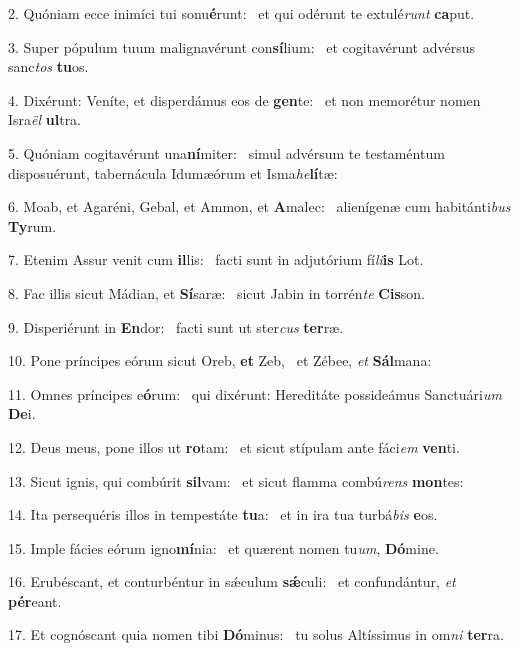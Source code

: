 2. Quóniam ecce inimíci tui sonu\textbf{é}runt: \ast\  et qui odérunt te extulé\textit{runt} \textbf{ca}put.\

3. Super pópulum tuum malignavérunt con\textbf{sí}lium: \ast\  et cogitavérunt advérsus sanc\textit{tos} \textbf{tu}os.\

4. Dixérunt: Veníte, et disperdámus eos de \textbf{gen}te: \ast\  et non memorétur nomen Isra\textit{ël} \textbf{ul}tra.\

5. Quóniam cogitavérunt una\textbf{ní}miter: \ast\  simul advérsum te testaméntum disposuérunt, tabernácula Idumæórum et Isma\textit{he}\textbf{lí}tæ:\

6. Moab, et Agaréni, Gebal, et Ammon, et \textbf{A}malec: \ast\  alienígenæ cum habitánti\textit{bus} \textbf{Ty}rum.\

7. Etenim Assur venit cum \textbf{il}lis: \ast\  facti sunt in adjutórium fí\textit{li}\textbf{is} Lot.\

8. Fac illis sicut Mádian, et \textbf{Sí}saræ: \ast\  sicut Jabin in torrén\textit{te} \textbf{Cis}son.\

9. Disperiérunt in \textbf{En}dor: \ast\  facti sunt ut ster\textit{cus} \textbf{ter}ræ.\

10. Pone príncipes eórum sicut Oreb, \textbf{et} Zeb, \ast\  et Zébee, \textit{et} \textbf{Sál}mana:\

11. Omnes príncipes e\textbf{ó}rum: \ast\  qui dixérunt: Hereditáte possideámus Sanctuári\textit{um} \textbf{De}i.\

12. Deus meus, pone illos ut \textbf{ro}tam: \ast\  et sicut stípulam ante fáci\textit{em} \textbf{ven}ti.\

13. Sicut ignis, qui combúrit \textbf{sil}vam: \ast\  et sicut flamma combú\textit{rens} \textbf{mon}tes:\

14. Ita persequéris illos in tempestáte \textbf{tu}a: \ast\  et in ira tua turbá\textit{bis} \textbf{e}os.\

15. Imple fácies eórum igno\textbf{mí}nia: \ast\  et quærent nomen tu\textit{um}, \textbf{Dó}mine.\

16. Erubéscant, et conturbéntur in sǽculum \textbf{sǽ}culi: \ast\  et confundántur, \textit{et} \textbf{pér}eant.\

17. Et cognóscant quia nomen tibi \textbf{Dó}minus: \ast\  tu solus Altíssimus in om\textit{ni} \textbf{ter}ra.\


